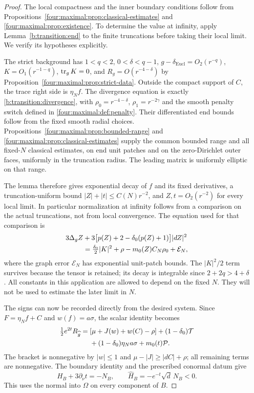 \begin{proof}
The local compactness and the inner boundary conditions follow from
Propositions~\ref{four:maximal:prop:classical-estimates} and
\ref{four:maximal:prop:existence}.  To determine the value at infinity,
apply Lemma~\ref{b:transition:end} to the finite truncations before
taking their local limit.  We verify its hypotheses explicitly.

The strict background has $1<q<2$, $0<\delta<q-1$,
$g-\delta_{\mathrm{Eucl}}=O_2(r^{-q})$,
$K=O_1(r^{-1-q})$, $\operatorname{tr}_gK=0$, and
$R_g=O(r^{-4-\delta})$ by
Proposition~\ref{four:maximal:prop:strict-data}.  Outside the compact
support of $C$, the trace right side is $\eta_N f$.
The divergence equation is exactly
\eqref{b:transition:divergence}, with
$\rho_0=r^{-4-\delta}$, $\rho_1=r^{-2\gamma}$ and the smooth penalty
switch defined in \eqref{four:maximal:def:penalty}.  Their differentiated
end bounds follow from the fixed smooth radial choices.
Propositions~\ref{four:maximal:prop:bounded-range} and
\ref{four:maximal:prop:classical-estimates} supply the common bounded
range and all fixed-$N$ classical estimates, on end unit patches and on
the zero-Dirichlet outer faces, uniformly in the truncation radius.
The leading matrix is uniformly elliptic on that range.

The lemma therefore gives exponential decay of $f$ and its fixed
derivatives, a truncation-uniform bound $|Z|+|t|\le C(N)r^{-2}$, and
$Z,t=O_2(r^{-2})$ for every local limit.  In particular normalization
at infinity follows from a comparison on the actual truncations, not
from local convergence.  The equation used for that comparison is
\begin{align}\label{four:maximal:end:zero-graph}
 3\Delta_g Z
 &+3\bigl[p(Z)+2-\delta_0(p(Z)+1)\bigr]|dZ|^2\notag\\
 &=\tfrac{\delta_0}{2}|K|^2+\rho
       -m_0(Z)C_N\rho_0+\mathcal E_N,
\end{align}
where the graph error $\mathcal E_N$ has exponential unit-patch bounds.
The $|K|^2/2$ term survives because the tensor is retained; its decay is
integrable since $2+2q>4+\delta$.  All constants in this application
are allowed to depend on the fixed $N$.  They will not be used to
estimate the later limit in $N$.

The signs can now be recorded directly from the desired system.
Since $F=\eta_N f+C$ and $w(f)=a\sigma$, the scalar identity becomes
\begin{align}\label{four:maximal:end:scalar-sign}
 \tfrac12e^{2t}R_{\widehat g}
 ={}&[\mu+J(w)+w(C)-\rho]
       +(1-\delta_0)\mathcal T\notag\\
    &+(1-\delta_0)\eta_N a\sigma+m_0(t)\mathcal P.
\end{align}
The bracket is nonnegative by $|w|\le1$ and
$\mu-|J|\ge|dC|+\rho$; all remaining terms are nonnegative.
The boundary identity and the prescribed conormal datum give
\begin{equation}\label{four:maximal:end:boundary-sign}
 H_B+3\partial_\nu t=-N_B,
 \qquad \widehat H_B=-e^{-t}\sqrt d\,N_B<0.
\end{equation}
This uses the normal into $\Omega$ on every component of $B$.


\end{proof}
